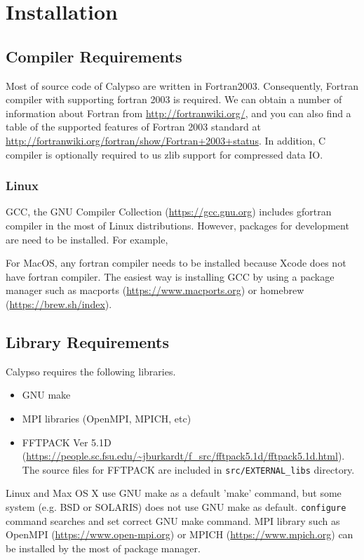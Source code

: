 \newpage
\section{Installation}


\subsection{Compiler Requirements}
Most of source code of Calypso are written in Fortran2003. Consequently, Fortran compiler with supporting fortran 2003 is required. We can obtain a number of information about Fortran from \url{http://fortranwiki.org/}, and you can also find a table of the supported features of Fortran 2003 standard at \url{http://fortranwiki.org/fortran/show/Fortran+2003+status}. In addition, C compiler is optionally required to us zlib support for compressed data IO. 

\subsubsection{Linux}
GCC, the GNU Compiler Collection (\url{https://gcc.gnu.org}) includes gfortran compiler in the most of Linux distributions. However, packages for development are need to be installed. For example, 


For MacOS, any fortran compiler needs to be installed because Xcode does not have fortran compiler. The easiest way is installing GCC by using a package manager such as macports (\url{https://www.macports.org}) or homebrew (\url{https://brew.sh/index}).


\subsection{Library Requirements}
\label{sec:requirements}
Calypso requires the following libraries.
\begin{itemize}
\item GNU make
\item MPI libraries (OpenMPI, MPICH, etc)
\item FFTPACK Ver 5.1D (\url{https://people.sc.fsu.edu/~jburkardt/f_src/fftpack5.1d/fftpack5.1d.html}). The source files for FFTPACK are included in {\tt src/EXTERNAL\_libs} directory.
\end{itemize}
Linux and Max OS X use GNU make as a default 'make' command, but some system (e.g. BSD or SOLARIS) does not use GNU make as default. \verb|configure| command searches and set correct GNU make command. MPI library such as OpenMPI (\url{https://www.open-mpi.org}) or MPICH (\url{https://www.mpich.org}) can be installed by the most of package manager.

